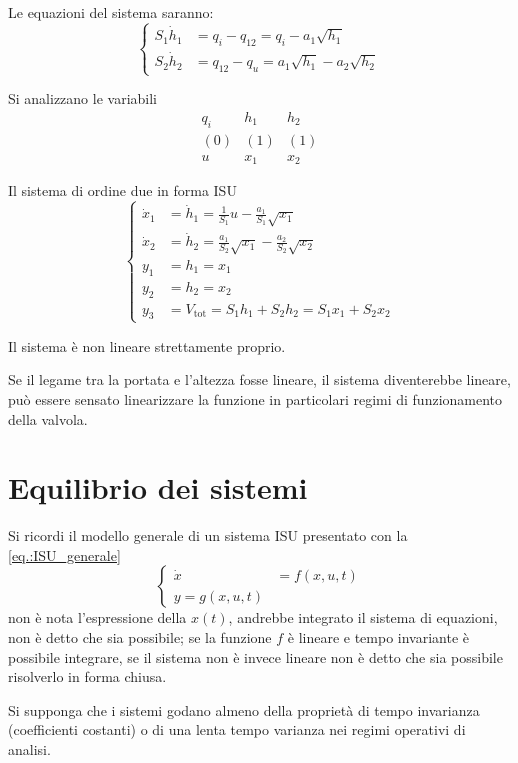 Le equazioni del sistema saranno:
$$\left\{\begin{aligned}
S_1\dot h_1 &= q_i - q_{12} = q_i - a_1\sqrt{h_1} \\
S_2 \dot h_2 &= q_{12} - q_u = a_1\sqrt{h_1} - a_2\sqrt{h_2}
\end{aligned}\right.$$

Si analizzano le variabili
$$\begin{matrix}
q_i & h_1 & h_2 \\
(0) & (1) & (1) \\
u & x_1 & x_2
\end{matrix}$$

Il sistema di ordine due in forma ISU
$$\left\{\begin{aligned}
\dot x_1 &= \dot h_1 = \frac{1}{S_1} u - \frac{a_1}{S_1} \sqrt{x_1} \\
\dot x_2 &= \dot h_2 = \frac{a_1}{S_2}\sqrt{x_1} - \frac{a_2}{S_2} \sqrt{x_2} \\
y_1 &= h_1 = x_1 \\
y_2 &= h_2 =x_2 \\
y_3 &= V_{\text{tot}} = S_1h_1 + S_2h_2 = S_1x_1 + S_2 x_2
\end{aligned}\right.$$

Il sistema è non lineare strettamente proprio.

Se il legame tra la portata e l'altezza fosse lineare, il sistema diventerebbe
lineare, può essere sensato linearizzare la funzione in particolari regimi di
funzionamento della valvola.


\section{Equilibrio dei sistemi}
Si ricordi il modello generale di un sistema ISU presentato con la
\ref{eq.:ISU_generale}
$$
\left\{\begin{aligned}
\dot x & = f(x,u,t) \\
y = g(x,u,t)
\end{aligned}\right.
$$
non è nota l'espressione della $x(t)$, andrebbe
integrato il sistema di equazioni, non è detto che sia possibile; se la
funzione $f$ è lineare e tempo invariante è possibile integrare, se il sistema
non è invece lineare non è detto che sia possibile risolverlo in forma chiusa.

Si supponga che i sistemi godano almeno della proprietà di tempo invarianza
(coefficienti costanti) o di una lenta tempo varianza nei regimi operativi di
analisi.

